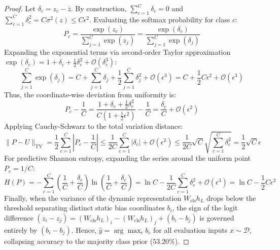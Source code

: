 \documentclass{article}
\begin{document}
\begin{proof}
Let $\delta_c = z_c - \bar{z}$. By construction, $\sum_{c=1}^C \delta_c = 0$ and $\sum_{c=1}^C \delta_c^2 = C \sigma^2(z) \le C \epsilon^2$. 
Evaluating the softmax probability for class $c$:
\begin{equation}
    P_c = \frac{\exp(z_c)}{\sum_{j=1}^C \exp(z_j)} = \frac{\exp(\delta_c)}{\sum_{j=1}^C \exp(\delta_j)}
\end{equation}
Expanding the exponential terms via second-order Taylor approximation $\exp(\delta_c) = 1 + \delta_c + \frac{1}{2}\delta_c^2 + \mathcal{O}(\delta_c^3)$:
\begin{equation}
    \sum_{j=1}^C \exp(\delta_j) = C + \sum_{j=1}^C \delta_j + \frac{1}{2}\sum_{j=1}^C \delta_j^2 + \mathcal{O}(\epsilon^3) = C + \frac{1}{2} C \epsilon^2 + \mathcal{O}(\epsilon^3)
\end{equation}
Thus, the coordinate-wise deviation from uniformity is:
\begin{equation}
    P_c - \frac{1}{C} = \frac{1 + \delta_c + \frac{1}{2}\delta_c^2}{C(1 + \frac{1}{2}\epsilon^2)} - \frac{1}{C} = \frac{\delta_c}{C} + \mathcal{O}(\epsilon^2)
\end{equation}
Applying Cauchy-Schwarz to the total variation distance:
\begin{equation}
    \|P - U\|_{\text{TV}} = \frac{1}{2}\sum_{c=1}^C \left|P_c - \frac{1}{C}\right| \le \frac{1}{2C} \sum_{c=1}^C |\delta_c| + \mathcal{O}(\epsilon^2) \le \frac{1}{2C} \sqrt{C} \sqrt{\sum_{c=1}^C \delta_c^2} = \frac{1}{2}\sqrt{C}\epsilon
\end{equation}
For predictive Shannon entropy, expanding the series around the uniform point $P_c = 1/C$:
\begin{equation}
    H(P) = -\sum_{c=1}^C \left(\frac{1}{C} + \frac{\delta_c}{C}\right) \ln\left(\frac{1}{C} + \frac{\delta_c}{C}\right) = \ln C - \frac{1}{2C} \sum_{c=1}^C \delta_c^2 + \mathcal{O}(\epsilon^3) = \ln C - \frac{1}{2} C \epsilon^2
\end{equation}
Finally, when the variance of the dynamic representation $W_{\text{cls}} h_L$ drops below the threshold separating distinct static bias coordinates $b_i$, the sign of the logit difference $(z_i - z_j) = (W_{\text{cls}} h_L)_i - (W_{\text{cls}} h_L)_j + (b_i - b_j)$ is governed entirely by $(b_i - b_j)$. Hence, $\hat{y} = \arg\max_c b_c$ for all evaluation inputs $x \sim \mathcal{D}$, collapsing accuracy to the majority class prior ($53.20\%$).
\end{proof}
\end{document}
